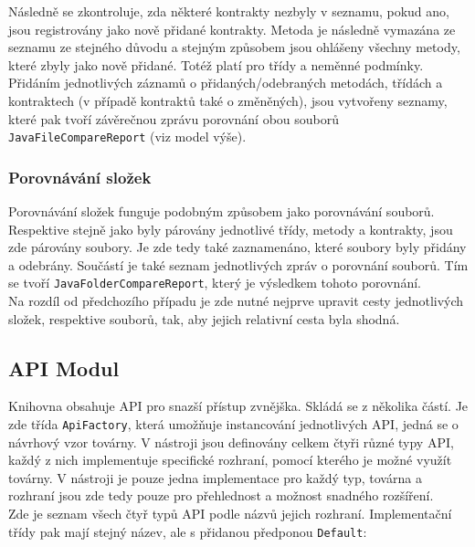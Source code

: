 	    	Následně se zkontroluje, zda některé kontrakty nezbyly v seznamu, pokud ano, jsou registrovány jako nově přidané kontrakty. Metoda je následně vymazána ze seznamu ze stejného důvodu a stejným způsobem jsou ohlášeny všechny metody, které zbyly jako nově přidané. Totéž platí pro třídy a neměnné podmínky. Přidáním jednotlivých záznamů o přidaných/odebraných metodách, třídách a kontraktech (v případě kontraktů také o změněných), jsou vytvořeny seznamy, které pak tvoří závěrečnou zprávu porovnání obou souborů \texttt{JavaFileCompareReport} (viz model výše).
	    
	    \subsubsection{Porovnávání složek}
			Porovnávání složek funguje podobným způsobem jako porovnávání souborů. Respektive stejně jako byly párovány jednotlivé třídy, metody a kontrakty, jsou zde párovány soubory. Je zde tedy také zaznamenáno, které soubory byly přidány a odebrány. Součástí je také seznam jednotlivých zpráv o porovnání souborů. Tím se tvoří \texttt{JavaFolderCompareReport}, který je výsledkem tohoto porovnání.\\
			
			Na rozdíl od předchozího případu je zde nutné nejprve upravit cesty jednotlivých složek, respektive souborů, tak, aby jejich relativní cesta byla shodná.

	    \subsection{API Modul}
	    	Knihovna obsahuje API pro snazší přístup zvnějška. Skládá se z několika částí. Je zde třída \texttt{ApiFactory}, která umožňuje instancování jednotlivých API, jedná se o návrhový vzor továrny. V nástroji jsou definovány celkem čtyři různé typy API, každý z nich implementuje specifické rozhraní, pomocí kterého je možné využít továrny. V nástroji je pouze jedna implementace pro každý typ, továrna a rozhraní jsou zde tedy pouze pro přehlednost a možnost snadného rozšíření.\\
	    	
	    	Zde je seznam všech čtyř typů API podle názvů jejich rozhraní. Implementační třídy pak mají stejný název, ale s přidanou předponou \texttt{Default}:
				
